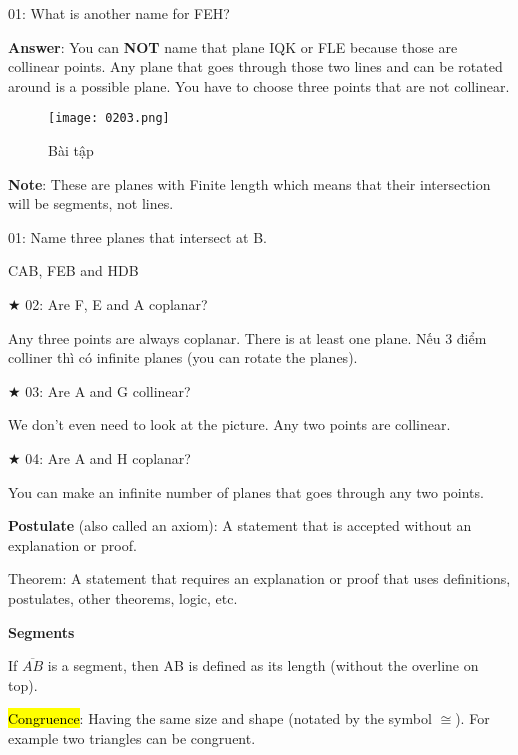 01: What is another name for FEH?

\textbf{Answer}: You can \textbf{NOT} name that plane IQK or FLE because those are collinear points. Any plane that goes through those two lines and can be rotated around is a possible plane. You have to choose three points that are not collinear.

\newpage

\begin{figure}[h!]
  \centering
  \texttt{[image: 0203.png]}
  \caption{Bài tập}
\end{figure}

\textbf{Note}: These are planes with Finite length which means that their intersection will be segments, not lines.

01: Name three planes that intersect at B.

CAB, FEB and HDB

$\bigstar$ 02: Are F, E and A coplanar?

Any three points are always coplanar. There is at least one plane. Nếu 3 điểm colliner thì có infinite planes (you can rotate the planes).

$\bigstar$ 03: Are A and G collinear?

We don't even need to look at the picture. Any two points are collinear.

$\bigstar$ 04: Are A and H coplanar?

You can make an infinite number of planes that goes through any two points.

\par\noindent\dotfill

\textbf{Postulate} (also called an axiom): A statement that is accepted without an explanation or proof.

Theorem: A statement that requires an explanation or proof that uses definitions, postulates, other theorems, logic, etc.

\vspace{1 cm}

\centerline{\textbf{\huge Segments}}

\vspace{0.2 cm}

If $\overline{AB}$ is a segment, then AB is defined as its length (without the overline on top).

\hl{Congruence}: Having the same size and shape (notated by the symbol $\cong$). For example two triangles can be congruent.

